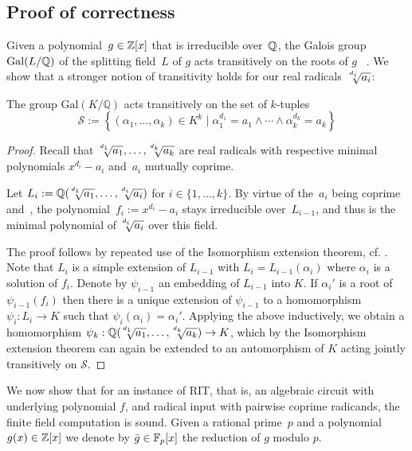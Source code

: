 \subsection{Proof of correctness}
\label{sec:correctness}

Given a polynomial~$g\in \mathbb{Z}[x]$ that is irreducible over~$\mathbb{Q}$, the Galois group $\operatorname{Gal}(L/\mathbb{Q})$ of the splitting field~$L$ of $g$ acts transitively on the roots of $g$~\cite[Proposition~22.3]{StewartBook} . We show that a stronger notion of transitivity holds for our real radicals~$\mysqrt{d_i}{a_i}$:  

\begin{lemma}\label{lem:jtrans}
The group
$\mathrm{Gal}(K/\mathbb{Q})$ acts transitively
on the set of $k$-tuples
\[ \mathcal{S}:=\left\{(\alpha_1,\ldots,\alpha_k) \in K^k \mid 
\alpha_1^{d_1}=a_1 \wedge \cdots \wedge \alpha_k^{d_k}=a_k 
\right\} \]
 \end{lemma}
\begin{proof}
Recall that $\mysqrt{d_1}{a_1},\ldots,\mysqrt{d_k}{a_k}$ are real radicals with respective minimal polynomials $x^{d_i}-a_i$ and~$a_i$ mutually coprime.


Let $L_i := \QQ(\mysqrt{d_1}{a_1}, \ldots, \mysqrt{d_i}{a_{i}})$ for $i\in\{1,\ldots,k\}$.
By virtue of the~$a_i$ being coprime and~\cite[Lemma 4.6]{blomer98}, 
the polynomial~$f_i := x^{d_i}-a_i$ stays irreducible over~$L_{i-1}$, and thus is the minimal polynomial of $\mysqrt{d_i}{a_i}$
 over this field.
 
The proof follows by repeated use of the Isomorphism extension theorem, cf. \cite[Theorem~5.12]{StewartBook}.
Note that $L_{i}$ is a simple extension of $L_{i-1}$ with $L_{i} = L_{i-1}(\alpha_i)$ where $\alpha_i$ is a solution of $f_i$. Denote by $\psi_{i-1}$ an embedding of $L_{i-1}$ into $K$. If $\alpha_i'$ is a root of $\psi_{i-1}(f_i)$ then there is a unique extension of $\psi_{i-1}$ to a homomorphism $\psi_i : L_i \to K$ such that $\psi_i(\alpha_i) = \alpha_i'$.
Applying the above inductively, we obtain a homomorphism $\psi_{k} : \QQ(\mysqrt{d_1}{a_1}, \ldots, \mysqrt{d_k}{a_{k}}) \to K$, which by the Isomorphism extension theorem can again be extended to an automorphism of $K$ acting jointly transitively on $\mathcal{S}$.
\end{proof}


We now show that for an instance of  RIT, that is, an algebraic circuit with underlying polynomial $f$, and radical input with pairwise coprime radicands, the finite field computation is sound.
Given a rational prime~$p$ and a polynomial $g(x)\in \mathbb{Z}[x]$ we denote by $\bar{g}\in \mathbb{F}_p[x]$  the reduction of $g$ modulo $p$.

